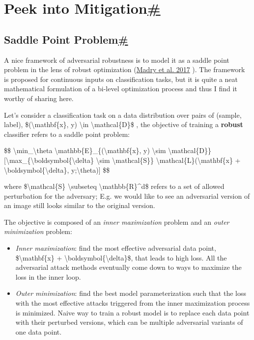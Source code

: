 \section{\texorpdfstring{Peek into Mitigation\hyperref[peek-into-mitigation]{\#}}{Peek into Mitigation\#}}\label{peek-into-mitigation}

\subsection{\texorpdfstring{Saddle Point Problem\hyperref[saddle-point-problem]{\#}}{Saddle Point Problem\#}}\label{saddle-point-problem}

A nice framework of adversarial robustness is to model it as a saddle point problem in the lens of robust optimization (\href{https://arxiv.org/abs/1706.06083}{Madry et al. 2017} ). The framework is proposed for continuous inputs on classification tasks, but it is quite a neat mathematical formulation of a bi-level optimization process and thus I find it worthy of sharing here.

Let's consider a classification task on a data distribution over pairs of (sample, label), \$(\textbackslash mathbf\{x\}, y) \textbackslash in \textbackslash mathcal\{D\}\$ , the objective of training a \textbf{robust} classifier refers to a saddle point problem:

\$\$ \textbackslash min\_\textbackslash theta \textbackslash mathbb\{E\}\_\{(\textbackslash mathbf\{x\}, y) \textbackslash sim \textbackslash mathcal\{D\}\} {[}\textbackslash max\_\{\textbackslash boldsymbol\{\textbackslash delta\} \textbackslash sim \textbackslash mathcal\{S\}\} \textbackslash mathcal\{L\}(\textbackslash mathbf\{x\} + \textbackslash boldsymbol\{\textbackslash delta\}, y;\textbackslash theta){]} \$\$

where \$\textbackslash mathcal\{S\} \textbackslash subseteq \textbackslash mathbb\{R\}\^{}d\$ refers to a set of allowed perturbation for the adversary; E.g. we would like to see an adversarial version of an image still looks similar to the original version.

The objective is composed of an \emph{inner maximization} problem and an \emph{outer minimization} problem:

\begin{itemize}
\tightlist
\item
  \emph{Inner maximization}: find the most effective adversarial data point, \$\textbackslash mathbf\{x\} + \textbackslash boldsymbol\{\textbackslash delta\}\$, that leads to high loss. All the adversarial attack methods eventually come down to ways to maximize the loss in the inner loop.
\item
  \emph{Outer minimization}: find the best model parameterization such that the loss with the most effective attacks triggered from the inner maximization process is minimized. Naive way to train a robust model is to replace each data point with their perturbed versions, which can be multiple adversarial variants of one data point.
\end{itemize}

